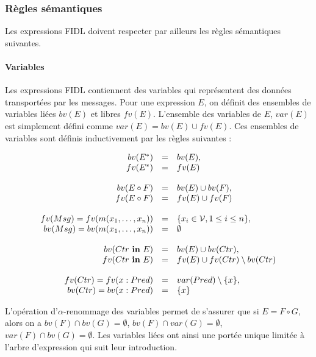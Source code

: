 \subsubsection{R\`egles s\'emantiques}

Les expressions FIDL doivent respecter par ailleurs les r\`egles
s\'emantiques suivantes. 

\paragraph{Variables}

Les expressions FIDL contiennent des variables qui repr\'esentent des
donn\'ees transport\'ees par les messages. Pour une expression $E$,
on d\'efinit des
ensembles de variables li\'ees $bv(E)$ et libres $fv(E)$. L'ensemble
des variables de $E$, $var(E)$ est simplement d\'efini comme $var(E)
= bv(E) \cup fv(E)$. Ces
ensembles de variables sont d\'efinis inductivement par les r\`egles
suivantes :

$$
\begin{array}{rcl}
bv(E^*) &=&  bv(E), \\
fv(E^*) &=&  fv(E) \\
\\
bv(E\circ F) &=&  bv(E) \cup bv(F), \\
fv(E\circ F) &=&  fv(E) \cup fv(F) \\
\\
fv(Msg) = fv(m(x_1,\dots,x_n)) &=& \{x_i \in {\cal V},
1\leq i \leq n\}, \\
bv(Msg) = bv(m(x_1,\dots,x_n)) &=& \emptyset \\
\\
bv(Ctr\ \mathbf{in}\ E) &=& bv(E) \cup
bv(Ctr), \\
fv(Ctr\ \mathbf{in}\ E) &=& fv(E)\cup fv(Ctr) \setminus
bv(Ctr) \\
\\
fv(Ctr) = fv(x:Pred) &=& var(Pred)\setminus \{x\}, \\
bv(Ctr) = bv(x:Pred) &=& \{x\} \\
\end{array}
$$

L'op\'eration d'$\alpha$-renommage des variables permet de s'assurer
que si $E=F\circ G$, alors on a  $bv(F) \cap bv(G) = \emptyset$, $bv(F) \cap var(G) =
\emptyset$, $var(F) \cap bv(G) = \emptyset$. Les variables li\'ees
ont ainsi une port\'ee unique limit\'ee \`a l'arbre d'expression
qui suit leur introduction. 

